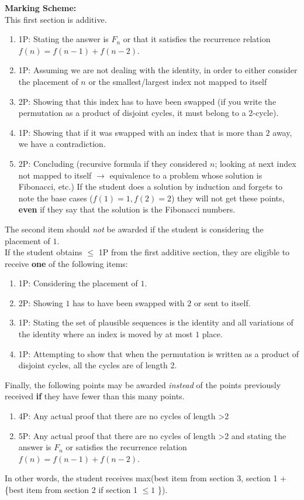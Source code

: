 \textbf{Marking Scheme:} \\
This first section is additive.
\begin{enumerate}
\item 1P: Stating the answer is $F_n$ or that it satisfies the recurrence relation $f(n) = f(n-1) + f(n-2)$.
\item 1P: Assuming we are not dealing with the identity, in order to either consider the placement of $n$ or the smallest/largest index not mapped to itself 
\item 2P: Showing that this index has to have been swapped (if you write the permutation as a product of disjoint cycles, it must belong to a 2-cycle). 
\item 1P: Showing that if it was swapped with an index that is more than $2$ away, we have a contradiction.
\item 2P: Concluding (recursive formula if they considered $n$; looking at next index not mapped to itself $\to$ equivalence to a problem whose solution is Fibonacci, etc.) If the student does a solution by induction and forgets to note the base cases ($f(1) = 1, f(2) = 2$) they will not get these points, \textbf{even} if they say that the solution is the Fibonacci numbers. 
\end{enumerate}
The second item should \emph{not} be awarded if the student is considering the placement of $1$. \\
If the student obtains $\le$ 1P from the first additive section, they are eligible to receive \textbf{one} of the following items:
\begin{enumerate}
\item 1P: Considering the placement of $1$.
\item 2P: Showing $1$ has to have been swapped with $2$ or sent to itself.
\item 1P: Stating the set of plausible sequences is the identity and all variations of the identity where an index is moved by at most $1$ place. 
\item 1P: Attempting to show that when the permutation is written as a product of disjoint cycles, all the cycles are of length 2.
\end{enumerate}
Finally, the following points may be awarded \emph{instead} of the points previously received \textbf{if} they have fewer than this many points. 
\begin{enumerate}
\item 4P: Any actual proof that there are no cycles of length >2
\item 5P: Any actual proof that there are no cycles of length >2 and stating the answer is $F_n$ or satisfies the recurrence relation $f(n) = f(n-1) + f(n-2)$.
\end{enumerate}
In other words, the student receives max(best item from section 3, section 1 + \{best item from section 2 if section 1 $\le 1$ \}).  
